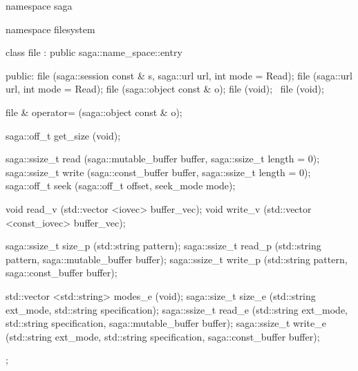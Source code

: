   \begin{mycode}[label=Prototype: saga::filesystem::file]
  namespace saga
  {
    namespace filesystem 
    {
      class file 
        : public saga::name_space::entry
      {
        public:
          file (saga::session const & s, 
                saga::url             url, 
                int                   mode = Read);
          file (saga::url url, 
                int                   mode = Read);
          file (saga::object const &  o);
          file (void);
          ~file (void);
  
          file & operator= (saga::object const & o);
  
          saga::off_t   get_size (void);
  
          saga::ssize_t read     (saga::mutable_buffer buffer, 
                                  saga::ssize_t        length = 0);
          saga::ssize_t write    (saga::const_buffer   buffer, 
                                  saga::ssize_t        length = 0);
          saga::off_t   seek     (saga::off_t          offset, 
                                  seek_mode            mode);
  
          void          read_v   (std::vector <iovec>  buffer_vec);
          void          write_v  (std::vector <const_iovec> 
                                  buffer_vec);
  
          saga::ssize_t size_p   (std::string          pattern);
          saga::ssize_t read_p   (std::string          pattern, 
                                  saga::mutable_buffer buffer);
          saga::ssize_t write_p  (std::string          pattern, 
                                  saga::const_buffer   buffer);
  
          std::vector <std::string> 
            modes_e  (void);
          saga::size_t  size_e   (std::string          ext_mode, 
                                  std::string          specification);
          saga::ssize_t read_e   (std::string          ext_mode, 
                                  std::string          specification,
                                  saga::mutable_buffer buffer);
          saga::ssize_t write_e  (std::string          ext_mode, 
                                  std::string          specification,
                                  saga::const_buffer   buffer);
      };
    }
  } 
  \end{mycode}

